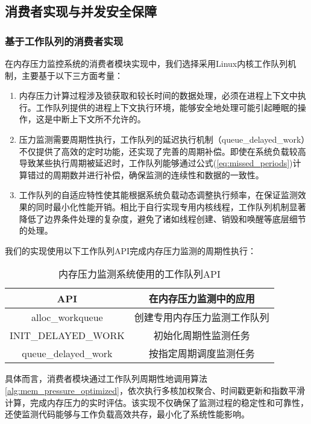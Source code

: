 \subsection{消费者实现与并发安全保障}
\label{sec:consumer_implementation}

\subsubsection{基于工作队列的消费者实现}
\label{sec:工作队列}
在内存压力监控系统的消费者模块实现中，我们选择采用Linux内核工作队列机制，主要基于以下三方面考量：
\begin{enumerate}
    \item 内存压力计算过程涉及锁获取和较长时间的数据处理，必须在进程上下文中执行。工作队列提供的进程上下文执行环境，能够安全地处理可能引起睡眠的操作，这是中断上下文所不允许的。
    \item 压力监测需要周期性执行，工作队列的延迟执行机制（queue\_delayed\_work）不仅提供了高效的定时功能，还实现了完善的周期补偿。即使在系统负载较高导致某些执行周期被延迟时，工作队列能够通过公式(\ref{eq:missed_periods})计算错过的周期数并进行补偿，确保监测的连续性和数据的一致性。
    \item 工作队列的自适应特性使其能根据系统负载动态调整执行频率，在保证监测效果的同时最小化性能开销。相比于自行实现专用内核线程，工作队列机制显著降低了边界条件处理的复杂度，避免了诸如线程创建、销毁和唤醒等底层细节的处理。
\end{enumerate}

我们的实现使用以下工作队列API完成内存压力监测的周期性执行：

\begin{table}[htbp]
\centering
\caption{内存压力监测系统使用的工作队列API}
\label{tab:workqueue_api}
\begin{tabular}{cc}
\toprule
\textbf{API} & \textbf{在内存压力监测中的应用} \\
\midrule
alloc\_workqueue & 创建专用内存压力监测工作队列 \\
INIT\_DELAYED\_WORK & 初始化周期性监测任务 \\
queue\_delayed\_work & 按指定周期调度监测任务 \\
\bottomrule
\end{tabular}
\end{table}

具体而言，消费者模块通过工作队列周期性地调用算法\ref{alg:mem_pressure_optimized}，依次执行多核加权聚合、时间戳更新和指数平滑计算，完成内存压力的实时评估。该实现不仅确保了监测过程的稳定性和可靠性，还使监测代码能够与工作负载高效共存，最小化了系统性能影响。

